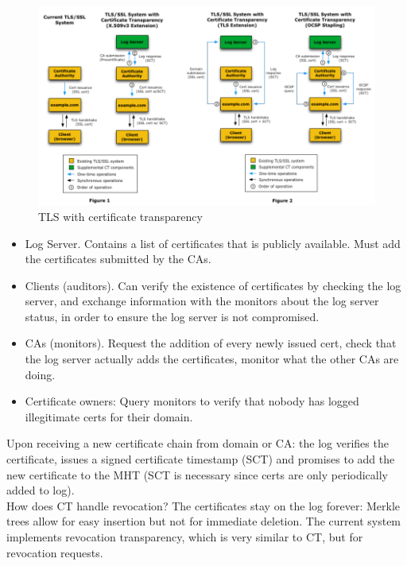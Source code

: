\documentclass[11pt,oneside,a4paper]{article}
\begin{document}
\begin{figure}
	\centering
	\includegraphics[width=0.9\linewidth]{figures/tls_with_ct}
	\caption{TLS with certificate transparency}
	\label{fig:tlswithct}
\end{figure}


\vspace{-\topsep}
\begin{itemize}
	\setlength{\itemsep}{0pt}
	\setlength{\parskip}{0pt}
	\item Log Server. Contains a list of certificates that is publicly available. Must
	add the certificates submitted by the CAs.
	\item Clients (auditors). Can verify the existence of certificates by checking the log server,
	and exchange information with the monitors about the log server status, in order to
	ensure the log server is not compromised.
	\item CAs (monitors). Request the addition of every newly issued cert, check that the log
	server actually adds the certificates, monitor what the other CAs are doing.
	\item Certificate owners: Query monitors to verify that nobody has logged illegitimate certs for their domain.
\end{itemize}
\vspace{-\topsep}

\newpage

Upon receiving a new certificate chain from domain or CA: the log verifies the certificate, issues a signed certificate timestamp (SCT) and promises to add the new certificate to the MHT (SCT is necessary since certs are only periodically added to log).\\
How does CT handle revocation? The certificates stay on the log forever: Merkle trees allow for easy insertion but not for immediate deletion. The current system implements revocation transparency, which is very similar to CT, but for revocation requests.\\
\end{document}

